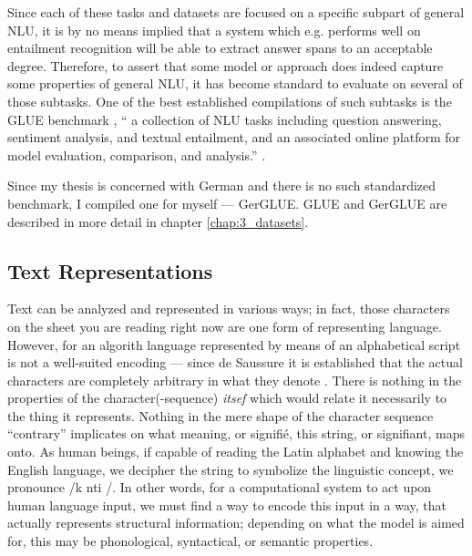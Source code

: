 Since each of these tasks and datasets are focused on a specific subpart of general NLU,
it is by no means implied that a system which e.g. performs well on entailment recognition
will be able to extract answer spans to an acceptable degree. Therefore, to assert that some
model or approach does indeed capture some properties of general NLU, it has become standard
to evaluate on several of those subtasks. One of the best established compilations of such
subtasks is the GLUE benchmark \citep{wang2018glue}, `` a collection of NLU tasks including
question answering, sentiment analysis, and textual entailment, and an associated online
platform for model evaluation, comparison, and analysis.'' \citep{wang2018glue}.

Since my thesis is concerned with German and there is no such standardized benchmark, I
compiled one for myself --- GerGLUE. GLUE and GerGLUE are described in more detail in
chapter \ref{chap:3_datasets}.


\subsection{Text Representations}

Text can be analyzed and represented in various ways; in fact, those characters on the
sheet you are reading right now are one form of representing language. However, for an
algorith language represented by means of an alphabetical script is not a well-suited
encoding --- since de Saussure it is established that the actual characters are completely
arbitrary in what they denote \citep{de1989cours}. There is nothing in the properties of
the character(-sequence) \emph{itsef} which would relate it necessarily to the thing it
represents. Nothing in the mere shape of the character sequence ``contrary'' implicates
on what meaning, or signifié, this string, or signifiant, maps onto. As human beings, if
capable of reading the Latin alphabet and knowing the English language, we decipher the
string to symbolize the linguistic concept, we pronounce /\textprimstress k\textscripta
nt\textturnr \textschwa \textturnr i /. In other words, for a computational system to act
upon human language input, we must find a way to encode this input in a way, that actually
represents structural information; depending on what the model is aimed for, this may be
phonological, syntactical, or semantic properties.

